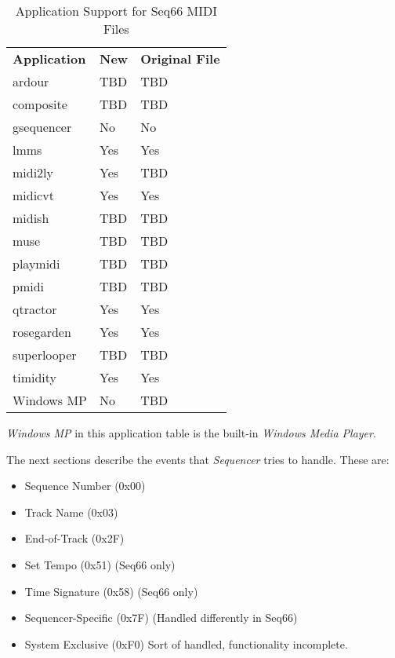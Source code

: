    \begin{table}
      \centering
      \caption{Application Support for Seq66 MIDI Files}
      \label{table:midi_file_support_table}
      \begin{tabular}{l l l}
         \textbf{Application}  &
            \textbf{New} & 
            \textbf{Original File} \\
         ardour       & TBD       & TBD \\
         composite    & TBD       & TBD \\
         gsequencer   & No        & No  \\
         lmms         & Yes       & Yes \\
         midi2ly      & Yes       & TBD \\
         midicvt      & Yes       & Yes \\
         midish       & TBD       & TBD \\
         muse         & TBD       & TBD \\
         playmidi     & TBD       & TBD \\
         pmidi        & TBD       & TBD \\
         qtractor     & Yes       & Yes \\
         rosegarden   & Yes       & Yes \\
         superlooper  & TBD       & TBD \\
         timidity     & Yes       & Yes \\
         Windows MP   & No        & TBD \\
      \end{tabular}
   \end{table}

   \textsl{Windows MP} in this application table is the
   built-in \textsl{Windows Media Player}.

   The next sections describe the events that \textsl{Sequencer} tries to
   handle.  These are:

   \begin{itemize}
      \item Sequence Number (0x00)
      \item Track Name (0x03)
      \item End-of-Track (0x2F)
      \item Set Tempo (0x51) (Seq66 only)
      \item Time Signature (0x58) (Seq66 only)
      \item Sequencer-Specific (0x7F) (Handled differently in Seq66)
      \item System Exclusive (0xF0) Sort of handled, functionality incomplete.
   \end{itemize}

